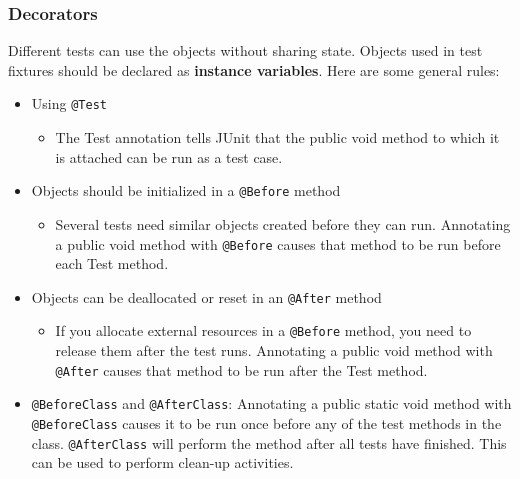 \documentclass{article}
\begin{document}
\subsubsection{Decorators}
Different tests can use the objects without sharing state. Objects used in test fixtures should be declared as \textbf{instance variables}. Here are some general rules:
\begin{itemize}
\item Using \lstinline{@Test}
    \begin{itemize}
        \item The Test annotation tells JUnit that the public void method to which it is attached can be run as a test case.
    \end{itemize}
\item Objects should be initialized in a \lstinline{@Before} method
    \begin{itemize}
        \item Several tests need similar objects created before they can run. Annotating a public void method with \lstinline{@Before} causes that method to be run before each Test method.
    \end{itemize}
\item Objects can be deallocated or reset in an \lstinline{@After} method
    \begin{itemize}
        \item If you allocate external resources in a \lstinline{@Before} method, you need to release them after the test runs. Annotating a public void method with \lstinline{@After} causes that method to be run after the Test method.
    \end{itemize}
\item \lstinline{@BeforeClass} and \lstinline{@AfterClass}: Annotating a public static void method with \lstinline{@BeforeClass} causes it to be run once before any of the test methods in the class. \lstinline{@AfterClass} will perform the method after all tests have finished. This can be used to perform clean-up activities.
\end{itemize}
\end{document}
